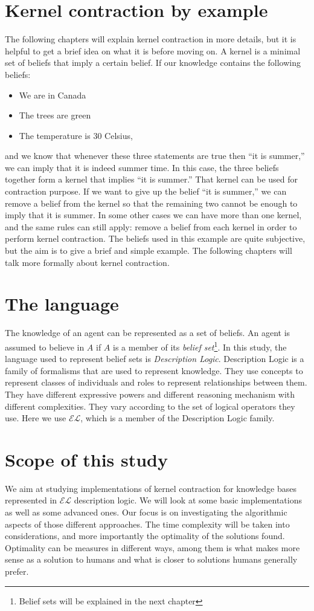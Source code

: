\section{Kernel contraction by example}
The following chapters will explain kernel contraction in more details, but it is helpful to get a brief idea on what it is before moving on. A kernel is a minimal set of beliefs that imply a certain belief. If our knowledge contains the following beliefs:
\begin{itemize}
\item We are in Canada
\item The trees are green
\item The temperature is 30 Celsius,
\end{itemize}
and we know that whenever these three statements are true then ``it is summer,'' we can imply that it is indeed summer time. In this case, the three beliefs together form a kernel that implies ``it is summer.'' That kernel can be used for contraction purpose. If we want to give up the belief ``it is summer,'' we can remove a belief from the kernel so that the remaining two cannot be enough to imply that it is summer. In some other cases we can have more than one kernel, and the same rules can still apply: remove a belief from each kernel in order to perform kernel contraction. The beliefs used in this example are quite subjective, but the aim is to give a brief and simple example. The following chapters will talk more formally about kernel contraction.

\section{The language}
The knowledge of an agent can be represented as a set of beliefs. An agent is assumed to believe in $A$ if $A$ is a member of its \textit{belief set}\footnote{Belief sets will be explained in the next chapter}. In this study, the language used to represent belief sets is \textit{Description Logic}. Description Logic is a family of formalisms that are used to represent knowledge. They use concepts to represent classes of individuals and roles to represent relationships between them. They have different expressive powers and different reasoning mechanism with different complexities. They vary according to the set of logical operators they use. Here we use $\mathcal{EL}$, which is a member of the Description Logic family.

\section{Scope of this study}
We aim at studying implementations of kernel contraction for knowledge bases represented in $\mathcal{EL}$ description logic. We will look at some basic implementations as well as some advanced ones. Our focus is on investigating the algorithmic aspects of those different approaches. The time complexity will be taken into considerations, and more importantly the optimality of the solutions found. Optimality can be measures in different ways, among them is what makes more sense as a solution to humans and what is closer to solutions humans generally prefer.

